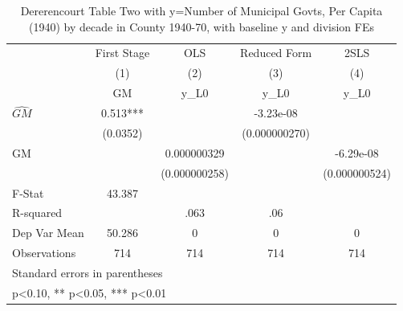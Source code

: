 \begin{table}[htbp]\centering
\def\sym#1{\ifmmode^{#1}\else\(^{#1}\)\fi}
\caption{Dererencourt Table Two with y=Number of Municipal Govts, Per Capita (1940) by decade in County 1940-70, with baseline y and division FEs}
\begin{tabular}{l*{4}{c}}
\toprule
                    & First Stage   &         OLS   &Reduced Form   &        2SLS   \\
                    &\multicolumn{1}{c}{(1)}&\multicolumn{1}{c}{(2)}&\multicolumn{1}{c}{(3)}&\multicolumn{1}{c}{(4)}\\
                    &\multicolumn{1}{c}{GM}&\multicolumn{1}{c}{y\_L0}&\multicolumn{1}{c}{y\_L0}&\multicolumn{1}{c}{y\_L0}\\
\midrule
$\hat{GM}$          &       0.513***&               &   -3.23e-08   &               \\
                    &    (0.0352)   &               &(0.000000270)   &               \\
\addlinespace
GM                  &               & 0.000000329   &               &   -6.29e-08   \\
                    &               &(0.000000258)   &               &(0.000000524)   \\
\midrule
F-Stat              &      43.387   &               &               &               \\
R-squared           &               &        .063   &         .06   &               \\
Dep Var Mean        &      50.286   &           0   &           0   &           0   \\
Observations        &         714   &         714   &         714   &         714   \\
\bottomrule
\multicolumn{5}{l}{\footnotesize Standard errors in parentheses}\\
\multicolumn{5}{l}{\footnotesize * p<0.10, ** p<0.05, *** p<0.01}\\
\end{tabular}
\end{table}
